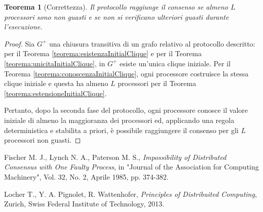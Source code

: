 \documentclass{article}
\newtheorem{teorema}{Teorema}
\begin{document}
\begin{teorema}[Correttezza]
  Il protocollo raggiunge il consenso se almeno $L$ processori sono
  non guasti e se non si verificano ulteriori guasti durante
  l'esecuzione.\end{teorema}
\begin{proof}
  Sia $G^+$ una chiusura transitiva di un grafo relativo al protocollo
  descritto: per il Teorema \ref{teorema:esistenzaInitialClique} e per
  il Teorema \ref{teorema:unicitaInitialClique}, in $G^+$ esiste
  un'unica clique iniziale. Per il Teorema
  \ref{teorema:conoscenzaInitialClique}, ogni processore costruisce la
  stessa clique iniziale e questa ha almeno $L$ processori per il
  Teorema \ref{teorema:estensioneInitialClique}.
  
  Pertanto, dopo la
  seconda fase del protocollo, ogni processore conosce il valore
  iniziale di almeno la maggioranza dei processori ed, applicando una
  regola deterministica e stabilita a priori, è possibile
  raggiungere il consenso per gli $L$ processori non guasti.
\end{proof}



\begin{thebibliography}{}

 Fischer M. J., Lynch N. A., Paterson M. S.,
  \emph{Impossibility of Distributed Consensus with One Faulty
    Process}, in "Journal of the Association for Computing Machinery",
  Vol. 32, No. 2, Aprile 1985, pp. 374-382.

 Locher T., Y. A. Pignolet, R. Wattenhofer,
  \textit{Principles of Distribuited Computing}, Zurich, Swiss Federal
  Institute of Technology, 2013.


\end{thebibliography}
\end{document}

